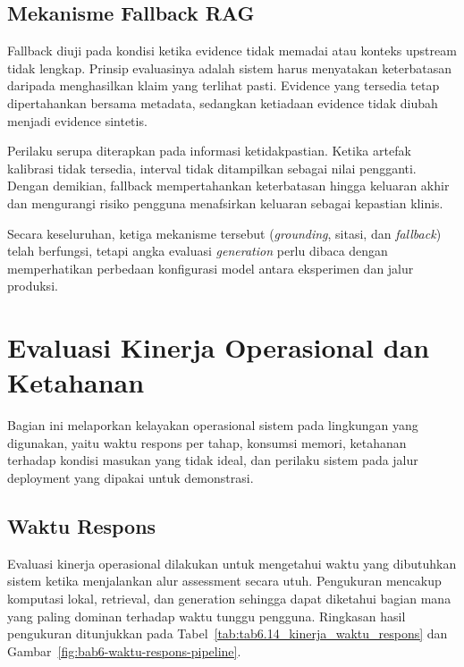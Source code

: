 \subsection{Mekanisme Fallback RAG}
\label{subsec:bab6-evaluasi-fallback-rag}

Fallback diuji pada kondisi ketika evidence tidak memadai atau konteks upstream tidak lengkap. Prinsip evaluasinya adalah sistem harus menyatakan
keterbatasan daripada menghasilkan klaim yang terlihat pasti. Evidence yang tersedia tetap dipertahankan bersama metadata, sedangkan ketiadaan evidence
tidak diubah menjadi evidence sintetis.

Perilaku serupa diterapkan pada informasi ketidakpastian. Ketika artefak kalibrasi tidak tersedia, interval tidak ditampilkan sebagai nilai pengganti.
Dengan demikian, fallback mempertahankan keterbatasan hingga keluaran akhir dan mengurangi risiko pengguna menafsirkan keluaran sebagai kepastian klinis.

Secara keseluruhan, ketiga mekanisme tersebut (\textit{grounding}, sitasi, dan \textit{fallback}) telah berfungsi, tetapi angka evaluasi \textit{generation}
perlu dibaca dengan memperhatikan perbedaan konfigurasi model antara eksperimen dan jalur produksi.

\section{Evaluasi Kinerja Operasional dan Ketahanan}
\label{sec:bab6-evaluasi-kinerja-operasional}

Bagian ini melaporkan kelayakan operasional sistem pada lingkungan yang digunakan, yaitu waktu respons per tahap, konsumsi memori, ketahanan terhadap kondisi
masukan yang tidak ideal, dan perilaku sistem pada jalur deployment yang dipakai untuk demonstrasi.

\subsection{Waktu Respons}
\label{subsec:bab6-waktu-respons-sistem}

Evaluasi kinerja operasional dilakukan untuk mengetahui waktu yang dibutuhkan sistem ketika menjalankan alur assessment secara utuh. Pengukuran mencakup
komputasi lokal, retrieval, dan generation sehingga dapat diketahui bagian mana yang paling dominan terhadap waktu tunggu pengguna. Ringkasan hasil
pengukuran ditunjukkan pada Tabel~\ref{tab:tab6.14_kinerja_waktu_respons} dan Gambar~\ref{fig:bab6-waktu-respons-pipeline}.

